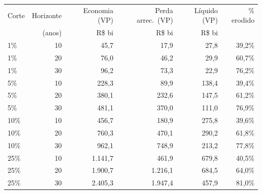\begin{tabular}{lrrrrr}
\toprule
Corte & Horizonte & Economia (VP) & Perda arrec.\ (VP) & Líquido (VP) & \% erodido \\
 & (anos) & R\$ bi & R\$ bi & R\$ bi & \\
\midrule
1\% & 10 & 45,7 & 17,9 & 27,8 & 39,2\% \\
1\% & 20 & 76,0 & 46,2 & 29,9 & 60,7\% \\
1\% & 30 & 96,2 & 73,3 & 22,9 & 76,2\% \\
\midrule
5\% & 10 & 228,3 & 89,9 & 138,4 & 39,4\% \\
5\% & 20 & 380,1 & 232,6 & 147,5 & 61,2\% \\
5\% & 30 & 481,1 & 370,0 & 111,0 & 76,9\% \\
\midrule
10\% & 10 & 456,7 & 180,9 & 275,8 & 39,6\% \\
10\% & 20 & 760,3 & 470,1 & 290,2 & 61,8\% \\
10\% & 30 & 962,1 & 748,9 & 213,2 & 77,8\% \\
\midrule
25\% & 10 & 1.141,7 & 461,9 & 679,8 & 40,5\% \\
25\% & 20 & 1.900,7 & 1.216,1 & 684,5 & 64,0\% \\
25\% & 30 & 2.405,3 & 1.947,4 & 457,9 & 81,0\% \\
\midrule
\bottomrule
\end{tabular}
